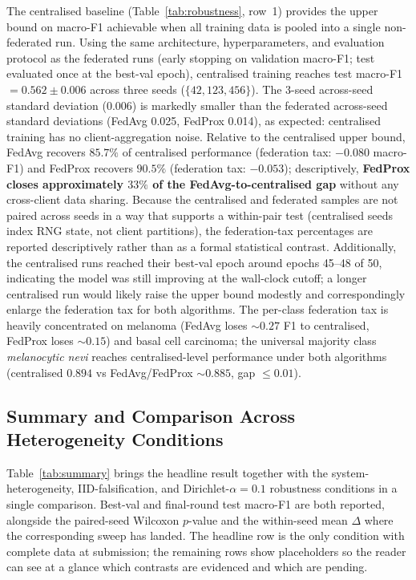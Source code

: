\documentclass[11pt,a4paper]{article}
\newif\ifshowtodo
\newcommand{\TODOhpc}[1]{%
  \ifshowtodo\textcolor{red}{\textbf{[HPC PENDING: #1]}}\else#1\fi}
\begin{document}
The centralised baseline (Table~\ref{tab:robustness}, row~1) provides the
upper bound on macro-F1 achievable when all training data is pooled into
a single non-federated run. Using the same architecture, hyperparameters,
and evaluation protocol as the federated runs (early stopping on validation
macro-F1; test evaluated once at the best-val epoch), centralised training
reaches test macro-F1 $= \mathbf{0.562 \pm 0.006}$ across three seeds
($\{42, 123, 456\}$). The 3-seed across-seed standard deviation (0.006)
is markedly smaller than the federated across-seed standard deviations
(FedAvg 0.025, FedProx 0.014), as expected: centralised training has no
client-aggregation noise. Relative to the centralised upper bound,
FedAvg recovers $85.7\%$ of centralised performance (federation tax:
$-0.080$ macro-F1) and FedProx recovers $90.5\%$ (federation tax:
$-0.053$); descriptively, \textbf{FedProx closes approximately $33\%$ of
the FedAvg-to-centralised gap} without any cross-client data sharing.
Because the centralised and federated samples are not paired across
seeds in a way that supports a within-pair test (centralised seeds index
RNG state, not client partitions), the federation-tax percentages are
reported descriptively rather than as a formal statistical contrast.
Additionally, the centralised runs reached their best-val epoch around
epochs 45–48 of 50, indicating the model was still improving at the
wall-clock cutoff; a longer centralised run would likely raise the upper
bound modestly and correspondingly enlarge the federation tax for both
algorithms. The per-class federation tax is heavily concentrated on
melanoma (FedAvg loses $\sim 0.27$ F1 to centralised, FedProx loses
$\sim 0.15$) and basal cell carcinoma; the universal majority class
\textit{melanocytic nevi} reaches centralised-level performance under
both algorithms (centralised $0.894$ vs FedAvg/FedProx $\sim 0.885$,
gap $\leq 0.01$).

\subsection{Summary and Comparison Across Heterogeneity
Conditions}\label{sec:summary}

Table~\ref{tab:summary} brings the headline result together with the
system-heterogeneity, IID-falsification, and Dirichlet-$\alpha = 0.1$
robustness conditions in a single comparison. Best-val and final-round
test macro-F1 are both reported, alongside the paired-seed Wilcoxon
$p$-value and the within-seed mean $\Delta$ where the corresponding
sweep has landed. The headline row is the only condition with complete
data at submission; the remaining rows show \TODOhpc{} placeholders so
the reader can see at a glance which contrasts are evidenced and which
are pending.
\end{document}
